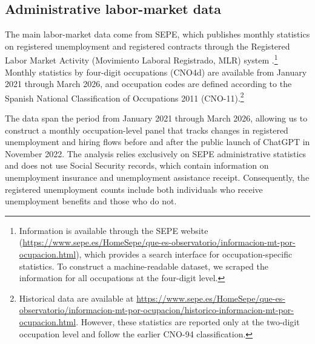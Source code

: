 \subsection{Administrative labor-market data}

The main labor-market data come from SEPE, which publishes monthly statistics on registered unemployment and registered contracts through the Registered Labor Market Activity (Movimiento Laboral Registrado, MLR) system \citep{sepe_stats}.\footnote{Information is available through the SEPE website (\url{https://www.sepe.es/HomeSepe/que-es-observatorio/informacion-mt-por-ocupacion.html}), which provides a search interface for occupation-specific statistics. To construct a machine-readable dataset, we scraped the information for all occupations at the four-digit level.} Monthly statistics by four-digit occupations (CNO4d) are available from January 2021 through March 2026, and occupation codes are defined according to the Spanish National Classification of Occupations 2011 (CNO-11).\footnote{Historical data are available at \url{https://www.sepe.es/HomeSepe/que-es-observatorio/informacion-mt-por-ocupacion/historico-informacion-mt-por-ocupacion.html}. However, these statistics are reported only at the two-digit occupation level and follow the earlier CNO-94 classification.} %

The data span the period from January 2021 through March 2026, allowing us to construct a monthly occupation-level panel that tracks changes in registered unemployment and hiring flows before and after the public launch of ChatGPT in November 2022. The analysis relies exclusively on SEPE administrative statistics and does not use Social Security records, which contain information on unemployment insurance and unemployment assistance receipt. Consequently, the registered unemployment counts include both individuals who receive unemployment benefits and those who do not.

